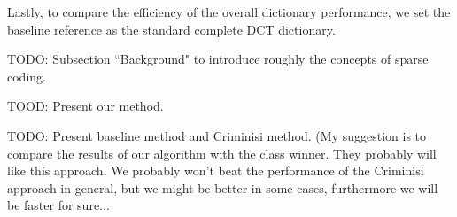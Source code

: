 Lastly, to compare the efficiency of the overall dictionary performance, we set the baseline reference as the standard complete DCT dictionary.




TODO: Subsection ``Background" to introduce roughly the concepts of sparse coding.

TOOD: Present our method.

TODO: Present baseline method and Criminisi method. (My suggestion is to compare the results of our algorithm with the class winner. They probably will like this approach. We probably won't beat the performance of the Criminisi approach in general, but we might be better in some cases, furthermore we will be faster for sure...
